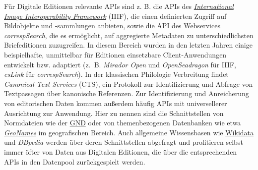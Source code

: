 \documentclass{article}
\begin{document}
        Für Digitale Editionen relevante APIs sind z. B. die APIs des \emph{\href{http://gams.uni-graz.at/o:konde.123}{International Image Interoperability Framework}} (IIIF), die einen definierten Zugriff auf Bildobjekte und -sammlungen anbieten, sowie die API des Webservices \emph{correspSearch}, die es ermöglicht, auf aggregierte Metadaten zu unterschiedlichsten Briefeditionen zuzugreifen. In diesem Bereich wurden in den letzten Jahren einige beispielhafte, unmittelbar für Editionen einsetzbare Client-Anwendungen entwickelt bzw. adaptiert (z. B. \emph{Mirador Open} und \emph{OpenSeadragon} für IIIF, \emph{csLink} für \emph{correspSearch}). In der klassischen Philologie Verbreitung findet \emph{Canonical Text Services} (CTS), ein Protokoll zur Identifizierung und Abfrage von Textpassagen über kanonische Referenzen. Zur Identifizierung und Anreicherung von editorischen Daten kommen außerdem häufig APIs mit universellerer Ausrichtung zur Anwendung. Hier zu nennen sind die Schnittstellen von Normdateien wie der \href{http://gams.uni-graz.at/o:konde.109}{GND} oder von themenbezogenen Datenbanken wie etwa \emph{\href{http://gams.uni-graz.at/o:konde.107}{GeoNames}} im geografischen Bereich. Auch allgemeine Wissensbasen wie \href{http://gams.uni-graz.at/o:konde.112}{Wikidata} und \emph{DBpedia} werden über deren Schnittstellen abgefragt und profitieren selbst immer öfter von Daten aus Digitalen Editionen, die über die entsprechenden APIs in den Datenpool zurückgespielt werden. \\
            
\end{document}
